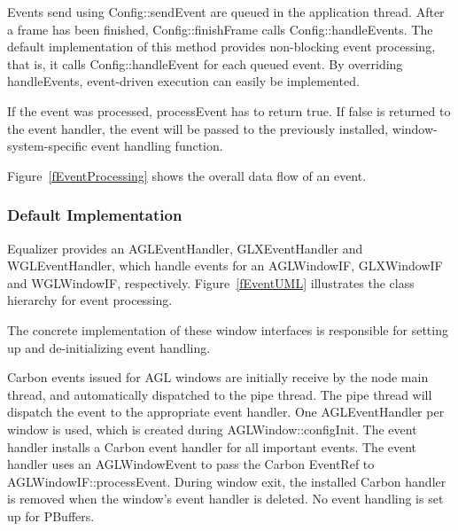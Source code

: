 \documentclass[10pt,a4]{scrartcl}
\newcommand{\fig}[1]{Figure~\ref{#1}}
\begin{document}
Events send using \textsf{Config::sendEvent} are queued in the
application thread. After a frame has been finished,
\textsf{Config::finishFrame} calls \textsf{Config::handleEvents}. The
default implementation of this method provides non-blocking event
processing, that is, it calls \textsf{Config::handleEvent} for each
queued event. By overriding \textsf{handleEvents}, event-driven
execution can easily be implemented.

If the event was processed, \textsf{processEvent} has to return
\textsf{true}. If \textsf{false} is returned to the event handler, the
event will be passed to the previously installed, window-system-specific
event handling function.

\fig{fEventProcessing} shows the overall data flow of an event.

\subsubsection{Default Implementation}

Equalizer provides an \textsf{AGLEvent\-Handler},
\textsf{GLXEventHandler} and \textsf{WGL\-Event\-Handler}, which handle
events for an \textsf{AGLWindowIF}, \textsf{GLXWindowIF} and
\textsf{WGL\-Win\-dowIF}, respectively. \fig{fEventUML} illustrates the
class hierarchy for event processing.

The concrete implementation of these window interfaces is responsible
for setting up and de-initializing event handling.

Carbon events issued for AGL windows are initially receive by the node
main thread, and automatically dispatched to the pipe thread. The pipe
thread will dispatch the event to the appropriate event handler. One
\textsf{AGLEventHandler} per window is used, which is created during
\textsf{AGLWindow::configInit}. The event handler installs a Carbon
event handler for all important events. The event handler uses an
\textsf{AGLWindowEvent} to pass the Carbon \textsf{EventRef} to
\textsf{AGLWindowIF::processEvent}. During window exit, the installed
Carbon handler is removed when the window's event handler is deleted. No
event handling is set up for PBuffers.
\end{document}
